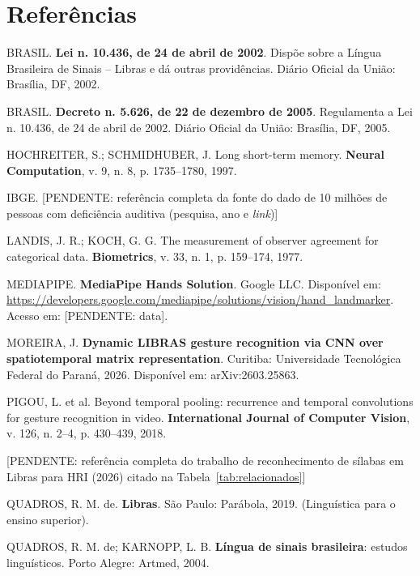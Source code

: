 \newpage
\section*{Referências}

\begingroup
\singlespacing
\setlength{\parindent}{0pt}
\setlength{\parskip}{0.7\baselineskip}

BRASIL. \textbf{Lei n. 10.436, de 24 de abril de 2002}. Dispõe sobre a Língua
Brasileira de Sinais – Libras e dá outras providências. Diário Oficial da União:
Brasília, DF, 2002.

BRASIL. \textbf{Decreto n. 5.626, de 22 de dezembro de 2005}. Regulamenta a Lei
n. 10.436, de 24 de abril de 2002. Diário Oficial da União: Brasília, DF, 2005.

HOCHREITER, S.; SCHMIDHUBER, J. Long short-term memory. \textbf{Neural
Computation}, v. 9, n. 8, p. 1735--1780, 1997.

IBGE. [PENDENTE: referência completa da fonte do dado de 10 milhões de pessoas
com deficiência auditiva (pesquisa, ano e \textit{link})]

LANDIS, J. R.; KOCH, G. G. The measurement of observer agreement for categorical
data. \textbf{Biometrics}, v. 33, n. 1, p. 159--174, 1977.

MEDIAPIPE. \textbf{MediaPipe Hands Solution}. Google LLC. Disponível em:
\url{https://developers.google.com/mediapipe/solutions/vision/hand_landmarker}.
Acesso em: [PENDENTE: data].

MOREIRA, J. \textbf{Dynamic LIBRAS gesture recognition via CNN over spatiotemporal
matrix representation}. Curitiba: Universidade Tecnológica Federal do Paraná,
2026. Disponível em: arXiv:2603.25863.

PIGOU, L. et al. Beyond temporal pooling: recurrence and temporal convolutions
for gesture recognition in video. \textbf{International Journal of Computer
Vision}, v. 126, n. 2--4, p. 430--439, 2018.

[PENDENTE: referência completa do trabalho de reconhecimento de sílabas em Libras
para HRI (2026) citado na Tabela~\ref{tab:relacionados}]

QUADROS, R. M. de. \textbf{Libras}. São Paulo: Parábola, 2019. (Linguística para
o ensino superior).

QUADROS, R. M. de; KARNOPP, L. B. \textbf{Língua de sinais brasileira}: estudos
linguísticos. Porto Alegre: Artmed, 2004.

